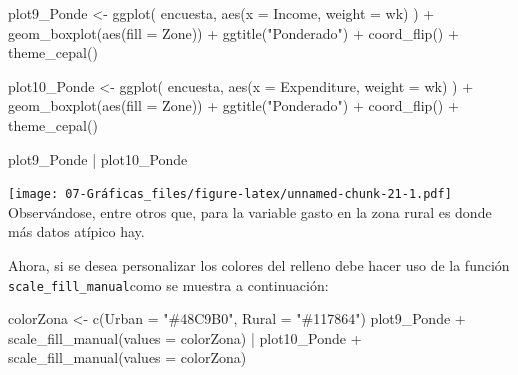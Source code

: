 \documentclass[
  12pt,
]{book}
\newenvironment{Shaded}{\begin{snugshade}}{\end{snugshade}}
\newcommand{\AttributeTok}[1]{\textcolor[rgb]{0.77,0.63,0.00}{#1}}
\newcommand{\FunctionTok}[1]{\textcolor[rgb]{0.00,0.00,0.00}{#1}}
\newcommand{\NormalTok}[1]{#1}
\newcommand{\OtherTok}[1]{\textcolor[rgb]{0.56,0.35,0.01}{#1}}
\newcommand{\SpecialCharTok}[1]{\textcolor[rgb]{0.00,0.00,0.00}{#1}}
\newcommand{\StringTok}[1]{\textcolor[rgb]{0.31,0.60,0.02}{#1}}
\begin{document}
\begin{Shaded}
\begin{Highlighting}[]
\NormalTok{plot9\_Ponde }\OtherTok{\textless{}{-}} \FunctionTok{ggplot}\NormalTok{(}
\NormalTok{  encuesta,}
  \FunctionTok{aes}\NormalTok{(}\AttributeTok{x =}\NormalTok{ Income, }\AttributeTok{weight =}\NormalTok{ wk)}
\NormalTok{) }\SpecialCharTok{+}
  \FunctionTok{geom\_boxplot}\NormalTok{(}\FunctionTok{aes}\NormalTok{(}\AttributeTok{fill =}\NormalTok{ Zone)) }\SpecialCharTok{+}
  \FunctionTok{ggtitle}\NormalTok{(}\StringTok{"Ponderado"}\NormalTok{) }\SpecialCharTok{+}
  \FunctionTok{coord\_flip}\NormalTok{() }\SpecialCharTok{+}
  \FunctionTok{theme\_cepal}\NormalTok{()}

\NormalTok{plot10\_Ponde }\OtherTok{\textless{}{-}} \FunctionTok{ggplot}\NormalTok{(}
\NormalTok{  encuesta,}
  \FunctionTok{aes}\NormalTok{(}\AttributeTok{x =}\NormalTok{ Expenditure, }\AttributeTok{weight =}\NormalTok{ wk)}
\NormalTok{) }\SpecialCharTok{+}
  \FunctionTok{geom\_boxplot}\NormalTok{(}\FunctionTok{aes}\NormalTok{(}\AttributeTok{fill =}\NormalTok{ Zone)) }\SpecialCharTok{+}
  \FunctionTok{ggtitle}\NormalTok{(}\StringTok{"Ponderado"}\NormalTok{) }\SpecialCharTok{+}
  \FunctionTok{coord\_flip}\NormalTok{() }\SpecialCharTok{+}
  \FunctionTok{theme\_cepal}\NormalTok{()}

\NormalTok{plot9\_Ponde }\SpecialCharTok{|}\NormalTok{ plot10\_Ponde}
\end{Highlighting}
\end{Shaded}

\texttt{[image: 07-Gráficas\_files/figure-latex/unnamed-chunk-21-1.pdf]}
Observándose, entre otros que, para la variable gasto en la zona rural es donde más datos atípico hay.

Ahora, si se desea personalizar los colores del relleno debe hacer uso de la función \texttt{scale\_fill\_manual}como se muestra a continuación:

\begin{Shaded}
\begin{Highlighting}[]
\NormalTok{colorZona }\OtherTok{\textless{}{-}} \FunctionTok{c}\NormalTok{(}\AttributeTok{Urban =} \StringTok{"\#48C9B0"}\NormalTok{, }\AttributeTok{Rural =} \StringTok{"\#117864"}\NormalTok{)}
\NormalTok{plot9\_Ponde }\SpecialCharTok{+} \FunctionTok{scale\_fill\_manual}\NormalTok{(}\AttributeTok{values =}\NormalTok{ colorZona) }\SpecialCharTok{|}
\NormalTok{  plot10\_Ponde }\SpecialCharTok{+} \FunctionTok{scale\_fill\_manual}\NormalTok{(}\AttributeTok{values =}\NormalTok{ colorZona)}
\end{Highlighting}
\end{Shaded}
\end{document}
